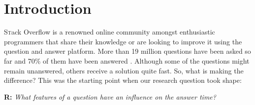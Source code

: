 \section{Introduction}
\label{sec:intro}

\lettrine[nindent=0em,lines=3]{S}tack Overflow is a renowned online community amongst enthusiastic programmers that share their knowledge or are looking to improve it using the question and answer platform.
More than 19 million questions have been asked so far and 70\% of them have been answered \cite{stackExchangeQuery}. Although some of the questions might remain unanswered, others receive a solution quite fast.
So, what is making the difference? This was the starting point when our research question took shape:

\begin{displayquote}
    \textbf{R:} \emph{What features of a question have an influence on the answer time?}
\end{displayquote}

\blindtext
